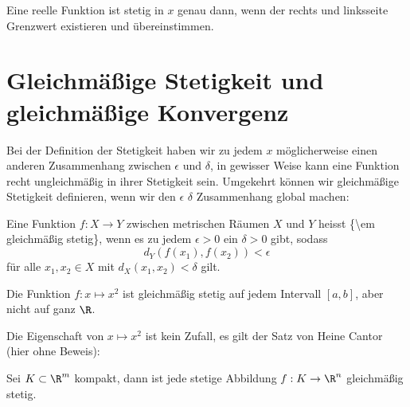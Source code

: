 \documentclass[letterpaper,10pt,english]{jupyterBook}
\begin{document}
Eine reelle Funktion ist stetig in \(x\) genau dann, wenn der rechts  und linksseite Grenzwert existieren und übereinstimmen.


\section{Gleichmäßige Stetigkeit und gleichmäßige Konvergenz}
\label{\detokenize{stetigkeit/glm:gleichmaszige-stetigkeit-und-gleichmaszige-konvergenz}}\label{\detokenize{stetigkeit/glm::doc}}
Bei der Definition der Stetigkeit haben wir zu jedem \(x\) möglicherweise einen anderen Zusammenhang zwischen \(\epsilon\) und \(\delta\), in gewisser Weise kann eine Funktion recht ungleichmäßig in ihrer Stetigkeit sein. Umgekehrt können wir gleichmäßige Stetigkeit definieren, wenn wir den \(\epsilon\) \(\delta\) Zusammenhang global machen:
\label{stetigkeit/glm:definition-0}
\begin{definition}{}{}



Eine Funktion \(f: X\rightarrow Y\) zwischen metrischen Räumen \(X\) und \(Y\) heisst \{\textbackslash{}em gleichmäßig stetig\}, wenn es zu jedem \(\epsilon > 0\) ein \(\delta > 0\) gibt, sodass
\begin{equation*}
 d_Y(f(x_1),f(x_2)) < \epsilon
\end{equation*}
für alle \(x_1,x_2 \in X\) mit \(d_X(x_1,x_2) < \delta\) gilt.
\end{definition}
\label{stetigkeit/glm:example-1}
\begin{example}{}{}



Die Funktion \(f:x \mapsto x^2\) ist gleichmäßig stetig auf jedem Intervall \([a,b]\), aber nicht auf ganz \(\R\).
\end{example}

Die Eigenschaft von \(x \mapsto x^2\) ist kein Zufall, es gilt der Satz von Heine Cantor (hier ohne Beweis):
\label{stetigkeit/glm:theorem-2}
\begin{theorem}{}{}



Sei \(K \subset \R^m\) kompakt, dann ist jede stetige Abbildung \(f:K \rightarrow \R^n\) gleichmäßig stetig.
\end{theorem}
\end{document}
